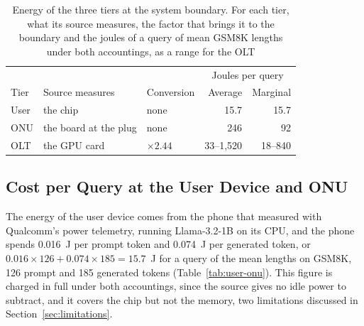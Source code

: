 \documentclass[cic,dipl,english]{infufrgs}
\begin{document}
\begin{table}[htb]
  \centering
  \caption[Energy of the three tiers at the system boundary]{Energy of the three tiers at the system boundary.
  For each tier, what its source measures, the factor that brings it to the boundary and the joules of a query of mean GSM8K lengths under both accountings, as a range for the OLT}
  \label{tab:energy}
  \begin{tabular}{lllrr}
    \toprule
    & & & \multicolumn{2}{c}{Joules per query} \\
    Tier & Source measures & Conversion & Average & Marginal \\
    \midrule
    User & the chip & none & 15.7 & 15.7 \\
    ONU & the board at the plug & none & 246 & 92 \\
    OLT & the GPU card & $\times 2.44$ & 33--1,520 & 18--840 \\
    \bottomrule
  \end{tabular}
\end{table}

\subsection{Cost per Query at the User Device and ONU}
\label{sec:user-onu-energy}

The energy of the user device comes from the phone that  measured
with Qualcomm's power telemetry, running Llama-3.2-1B on its CPU, and the phone spends
0.016~J per prompt token and 0.074~J per generated token, or
$0.016 \times 126 + 0.074 \times 185 = 15.7$~J for a query of the mean lengths on GSM8K,
126 prompt and 185 generated tokens (Table~\ref{tab:user-onu}). This figure is charged in full under both accountings, since
the source gives no idle power to subtract, and it covers the chip but not the memory, two
limitations discussed in Section~\ref{sec:limitations}.
\end{document}
